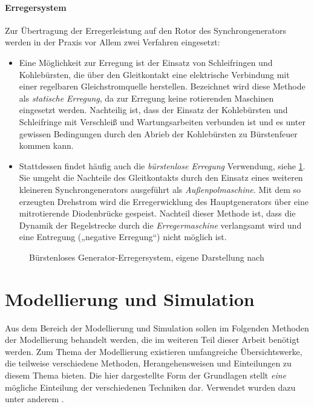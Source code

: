 \paragraph{Erregersystem}
Zur Übertragung der Erregerleistung auf den Rotor des Synchrongenerators werden in der Praxis vor Allem zwei Verfahren eingesetzt:
\begin{itemize}
	\item Eine Möglichkeit zur Erregung ist der Einsatz von Schleifringen und Kohlebürsten, die über den Gleitkontakt eine elektrische Verbindung mit einer regelbaren Gleichstromquelle herstellen. Bezeichnet wird diese Methode als \emph{statische Erregung}, da zur Erregung keine rotierenden Maschinen eingesetzt werden. Nachteilig ist, dass der Einsatz der Kohlebürsten und Schleifringe mit Verschleiß und Wartungsarbeiten verbunden ist und es unter gewissen Bedingungen durch den Abrieb der Kohlebürsten zu Bürstenfeuer kommen kann.

	\item Stattdessen findet häufig auch die \emph{bürstenlose Erregung} Verwendung, siehe \cref{fig:burstenloseErregung}. Sie umgeht die Nachteile des Gleitkontakts durch den Einsatz eines weiteren kleineren Synchrongenerators ausgeführt als \emph{Außenpolmaschine}. Mit dem so erzeugten Drehstrom wird die Erregerwicklung des Hauptgenerators über eine mitrotierende Diodenbrücke gespeist. Nachteil dieser Methode ist, dass die Dynamik der Regelstrecke durch die \emph{Erregermaschine} verlangsamt wird und eine Entregung („negative Erregung“) nicht möglich ist. 
\end{itemize}
\begin{figure}
    \centering
    
    \caption{Bürstenloses Generator-Erregersystem, eigene Darstellung nach \cite[S. 557]{mullerGrundlagenElektrischerMaschinen2005}}
    \label{fig:burstenloseErregung}
\end{figure}

\section{Modellierung und Simulation}
\label{sec:GrundlagenModellierung}
Aus dem Bereich der Modellierung und Simulation sollen im Folgenden Methoden der Modellierung behandelt werden, die im weiteren Teil dieser Arbeit benötigt werden. Zum Thema der Modellierung existieren umfangreiche Übersichtswerke, die teilweise verschiedene Methoden, Herangehensweisen und Einteilungen zu diesem Thema bieten. Die hier dargestellte Form der Grundlagen stellt \emph{eine} mögliche Einteilung der verschiedenen Techniken dar. Verwendet wurden dazu unter anderem \cites{janschekSystementwurfMechatronischerSysteme2010,gesenhuesObjektorientiertmodellbasierteCharakterisierungUberwachung2019,schroderElektrischeAntriebeRegelung2015}.

